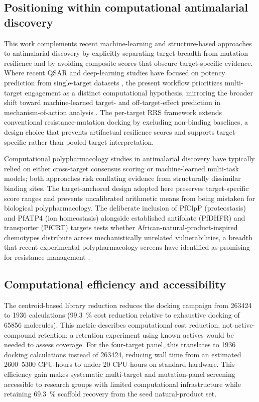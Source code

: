 \documentclass[11pt,a4paper]{article}
\begin{document}
	\subsection{Positioning within computational antimalarial discovery}\label{sec:disc_positioning}
	This work complements recent machine-learning and structure-based approaches to antimalarial discovery by explicitly separating target breadth from mutation resilience and by avoiding composite scores that obscure target-specific evidence. Where recent QSAR and deep-learning studies have focused on potency prediction from single-target datasets \cite{Wells2015,SiqueiraNeto2023,Sentinel2025Offtarget}, the present workflow prioritizes multi-target engagement as a distinct computational hypothesis, mirroring the broader shift toward machine-learned target- and off-target-effect prediction in mechanism-of-action analysis \cite{Trapotsi2022MoA}. The per-target RRS framework extends conventional resistance-mutation docking by excluding non-binding baselines, a design choice that prevents artifactual resilience scores and supports target-specific rather than pooled-target interpretation.
	
	Computational polypharmacology studies in antimalarial discovery have typically relied on either cross-target consensus scoring or machine-learned multi-task models; both approaches risk conflating evidence from structurally dissimilar binding sites. The target-anchored design adopted here preserves target-specific score ranges and prevents uncalibrated arithmetic means from being mistaken for biological polypharmacology. The deliberate inclusion of PfClpP (proteostasis) and PfATP4 (ion homeostasis) alongside established antifolate (PfDHFR) and transporter (PfCRT) targets tests whether African-natural-product-inspired chemotypes distribute across mechanistically unrelated vulnerabilities, a breadth that recent experimental polypharmacology screens have identified as promising for resistance management \cite{Wells2015,SiqueiraNeto2023,Blake2025Resistome}.
	
	\subsection{Computational efficiency and accessibility}\label{sec:disc_efficiency}
	The centroid-based library reduction reduces the docking campaign from \num{263424} to \num{1936} calculations (\qty{99.3}{\percent} cost reduction relative to exhaustive docking of \num{65856} molecules). This metric describes computational cost reduction, not active-compound retention; a retention experiment using known actives would be needed to assess coverage. For the four-target panel, this translates to \num{1936} docking calculations instead of \num{263424}, reducing wall time from an estimated \numrange{2600}{5300} CPU-hours to under \num{20} CPU-hours on standard hardware. This efficiency gain makes systematic multi-target and mutation-panel screening accessible to research groups with limited computational infrastructure while retaining \qty{69.3}{\percent} scaffold recovery from the seed natural-product set.
	
\end{document}
